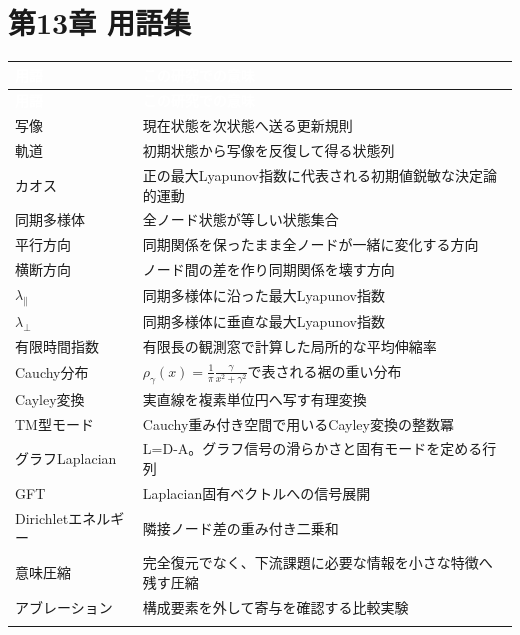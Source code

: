 \documentclass[11pt,a4paper]{ltjsarticle}
\renewcommand{\arraystretch}{1.25}
\begin{document}
\goodbreak

\section*{\textcolor{researchink}{第13章 用語集}}


\begingroup
\small
\renewcommand{\arraystretch}{1.35}
\begin{longtable}{@{}>{\raggedright\arraybackslash}p{}>{\raggedright\arraybackslash}p{}@{}}
\rowcolor{researchink}
\textcolor{white}{\textbf{用語}} & \textcolor{white}{\textbf{この研究での意味}} \\
\endfirsthead
\rowcolor{researchink}
\textcolor{white}{\textbf{用語}} & \textcolor{white}{\textbf{この研究での意味}} \\
\endhead
写像 & 現在状態を次状態へ送る更新規則 \\
\addlinespace[2pt]
\rowcolor{researchpale}
軌道 & 初期状態から写像を反復して得る状態列 \\
\addlinespace[2pt]
カオス & 正の最大Lyapunov指数に代表される初期値鋭敏な決定論的運動 \\
\addlinespace[2pt]
\rowcolor{researchpale}
同期多様体 & 全ノード状態が等しい状態集合 \\
\addlinespace[2pt]
平行方向 & 同期関係を保ったまま全ノードが一緒に変化する方向 \\
\addlinespace[2pt]
\rowcolor{researchpale}
横断方向 & ノード間の差を作り同期関係を壊す方向 \\
\addlinespace[2pt]
\(\lambda_{\parallel}\) & 同期多様体に沿った最大Lyapunov指数 \\
\addlinespace[2pt]
\rowcolor{researchpale}
\(\lambda_{\perp}\) & 同期多様体に垂直な最大Lyapunov指数 \\
\addlinespace[2pt]
有限時間指数 & 有限長の観測窓で計算した局所的な平均伸縮率 \\
\addlinespace[2pt]
\rowcolor{researchpale}
Cauchy分布 & \(\rho_{\gamma}(x)=\frac{1}{\pi}\frac{\gamma}{x^2+\gamma^2}\)で表される裾の重い分布 \\
\addlinespace[2pt]
Cayley変換 & 実直線を複素単位円へ写す有理変換 \\
\addlinespace[2pt]
\rowcolor{researchpale}
TM型モード & Cauchy重み付き空間で用いるCayley変換の整数冪 \\
\addlinespace[2pt]
グラフLaplacian & L=D-A。グラフ信号の滑らかさと固有モードを定める行列 \\
\addlinespace[2pt]
\rowcolor{researchpale}
GFT & Laplacian固有ベクトルへの信号展開 \\
\addlinespace[2pt]
Dirichletエネルギー & 隣接ノード差の重み付き二乗和 \\
\addlinespace[2pt]
\rowcolor{researchpale}
意味圧縮 & 完全復元でなく、下流課題に必要な情報を小さな特徴へ残す圧縮 \\
\addlinespace[2pt]
アブレーション & 構成要素を外して寄与を確認する比較実験 \\
\addlinespace[2pt]
\end{longtable}
\endgroup
\end{document}
